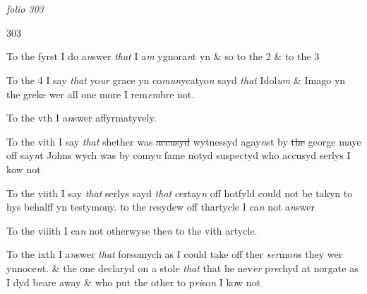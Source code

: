 \documentclass[12pt, a4paper]{book}
\begin{document}
\dotfill
						\newpage {} \section*{}  \subsection*{}

\textit{folio 303}



            		\begin{flushright}{\color{Mahogany}303}\end{flushright}

            		
		\ifthenelse{\isodd{\thepage}}
		{\reversemarginpar}
		{\normalmarginpar}
		To the fyrst I do a\textit{n}swer \textit{that} I a\textit{m} ygnora\textit{n}t yn \& so to the 2 \& to the 3
            		
		\ifthenelse{\isodd{\thepage}}
		{\reversemarginpar}
		{\normalmarginpar}
		To the 4 I say \textit{that} yo\textit{ur} grace yn co\textit{mun}ycatyo\textit{n} sayd \textit{that} Idol\textit{um} \& Imago yn
the greke wer all one more I rem\textit{em}bre not.
            		
		\ifthenelse{\isodd{\thepage}}
		{\reversemarginpar}
		{\normalmarginpar}
		To the vth I a\textit{n}swer affyrmatyvely. 
            		
		\ifthenelse{\isodd{\thepage}}
		{\reversemarginpar}
		{\normalmarginpar}
		To the vith I say \textit{that} shether was \sout{accusyd }wytnessyd agay\textit{n}st by \sout{the }
george maye off say\textit{n}t Johns wych was by comy\textit{n} fame notyd suspectyd
who accusyd serlys I kow not
            		
		\ifthenelse{\isodd{\thepage}}
		{\reversemarginpar}
		{\normalmarginpar}
		To the viith I say \textit{that} serlys sayd \textit{that} certay\textit{n} off hotfyld could not be
takyn to hys behalff yn testymony. to the resydew off thartycle I ca\textit{n} 
not a\textit{n}swer
            		
		\ifthenelse{\isodd{\thepage}}
		{\reversemarginpar}
		{\normalmarginpar}
		To the viiith I ca\textit{n} not otherwyse the\textit{n} to the vith artycle.
            		
		\ifthenelse{\isodd{\thepage}}
		{\reversemarginpar}
		{\normalmarginpar}
		To the ixth I a\textit{n}swer \textit{that} forsomych as I could take off ther \textit{ser}mo\textit{n}s
they wer ynnoce\textit{n}t. \& the one declaryd on a stole \textit{that} that he 
nev\textit{er} p\textit{re}chyd at norgate as I dyd beare away \& who put the 
other to p\textit{ri}so\textit{n} I kow not
            		
\end{document}
